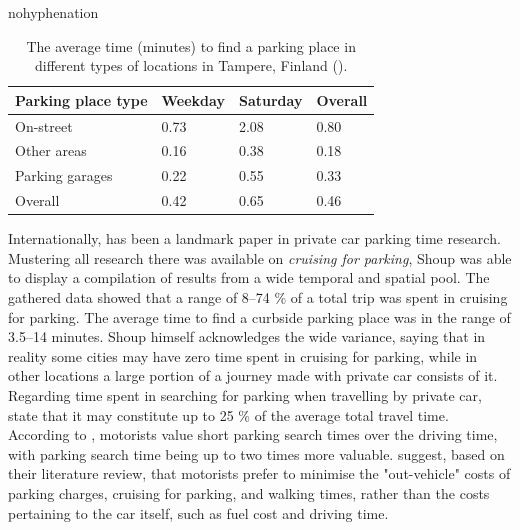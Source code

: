 \begin{hyphenrules}{nohyphenation}
    \begin{table}[H]
        \centering
        \caption[Parking time results in Kalenoja \& Häyrynen 2003]{The average time (minutes) to find a parking place in different types of locations in Tampere, Finland (\cite{Kalenoja2003}).} 
        \label{tab:kalenoja-parktimes}
        \begin{tabular}{ llll }
            \toprule
            Parking place type  & Weekday   & Saturday  & Overall \\
            \midrule
            On-street           & 0.73      & 2.08      & 0.80 \\
            Other areas         & 0.16      & 0.38      & 0.18 \\
            Parking garages     & 0.22      & 0.55      & 0.33 \\
            Overall             & 0.42      & 0.65      & 0.46 \\
            \bottomrule
        \end{tabular}
    \end{table}
\end{hyphenrules}

Internationally,  has been a landmark paper in private car parking time research. Mustering all research there was available on \textit{cruising for parking}, Shoup was able to display a compilation of results from a wide temporal and spatial pool. The gathered data showed that a range of 8--74 \% of a total trip was spent in cruising for parking. The average time to find a curbside parking place was in the range of 3.5--14 minutes. Shoup himself acknowledges the wide variance, saying that in reality some cities may have zero time spent in cruising for parking, while in other locations a large portion of a journey made with private car consists of it. Regarding time spent in searching for parking when travelling by private car,  state that it may constitute up to 25 \% of the average total travel time. According to , motorists value short parking search times over the driving time, with parking search time being up to two times more valuable.  suggest, based on their literature review, that motorists prefer to minimise the "out-vehicle" costs of parking charges, cruising for parking, and walking times, rather than the costs pertaining to the car itself, such as fuel cost and driving time.

